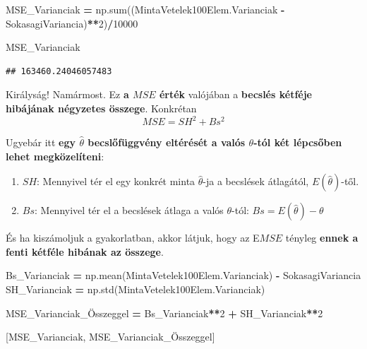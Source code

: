 \documentclass[
]{book}
\newenvironment{Shaded}{\begin{snugshade}}{\end{snugshade}}
\newcommand{\BuiltInTok}[1]{#1}
\newcommand{\DecValTok}[1]{\textcolor[rgb]{0.00,0.00,0.81}{#1}}
\newcommand{\NormalTok}[1]{#1}
\newcommand{\OperatorTok}[1]{\textcolor[rgb]{0.81,0.36,0.00}{\textbf{#1}}}
\providecommand{\tightlist}{%
  \setlength{\itemsep}{0pt}\setlength{\parskip}{0pt}}
\begin{document}
\begin{Shaded}
\begin{Highlighting}[]
\NormalTok{MSE\_Varianciak }\OperatorTok{=}\NormalTok{ np.}\BuiltInTok{sum}\NormalTok{((MintaVetelek100Elem.Varianciak }\OperatorTok{{-}}\NormalTok{ SokasagiVariancia)}\OperatorTok{**}\DecValTok{2}\NormalTok{)}\OperatorTok{/}\DecValTok{10000}

\NormalTok{MSE\_Varianciak}
\end{Highlighting}
\end{Shaded}

\begin{verbatim}
## 163460.24046057483
\end{verbatim}

Királyság! Namármost. Ez \textbf{a \(MSE\) érték} valójában a \textbf{becslés kétféje hibájának négyzetes összege}. Konkrétan \[MSE=SH^2+Bs^2\]

Ugyebár itt \textbf{egy \(\hat{\theta}\) becslőfüggvény eltérését a valós \(\theta\)-tól két lépcsőben lehet megközelíteni}:

\begin{enumerate}
\def\labelenumi{\arabic{enumi}.}
\tightlist
\item
  \(SH\): Mennyivel tér el egy konkrét minta \(\hat{\theta}\)-ja a becslések átlagától, \(E(\hat{\theta})\)-től.
\item
  \(Bs\): Mennyivel tér el a becslések átlaga a valós \(\theta\)-tól: \(Bs = E(\hat{\theta}) - \theta\)
\end{enumerate}

És ha kiszámoljuk a gyakorlatban, akkor látjuk, hogy az E\(MSE\) tényleg \textbf{ennek a fenti kétféle hibának az összege}.

\begin{Shaded}
\begin{Highlighting}[]
\NormalTok{Bs\_Varianciak }\OperatorTok{=}\NormalTok{ np.mean(MintaVetelek100Elem.Varianciak) }\OperatorTok{{-}}\NormalTok{ SokasagiVariancia}
\NormalTok{SH\_Varianciak }\OperatorTok{=}\NormalTok{ np.std(MintaVetelek100Elem.Varianciak)}

\NormalTok{MSE\_Varianciak\_Összeggel }\OperatorTok{=}\NormalTok{ Bs\_Varianciak}\OperatorTok{**}\DecValTok{2} \OperatorTok{+}\NormalTok{ SH\_Varianciak}\OperatorTok{**}\DecValTok{2}

\NormalTok{[MSE\_Varianciak, MSE\_Varianciak\_Összeggel]}
\end{Highlighting}
\end{Shaded}
\end{document}
